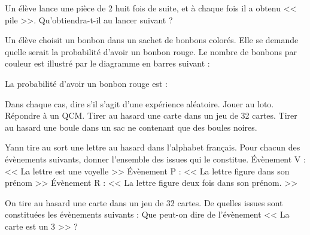 \documentclass["../Cours.tex"]{subfiles}
\begin{document}
\begin{questions}
    \exercice Un élève lance une pièce de \qty{2}{\EURO} huit fois de suite, et à chaque fois il a obtenu << pile >>. Qu'obtiendra-t-il au lancer suivant ?

    \exercice Un élève choisit un bonbon dans un sachet de bonbons colorés. Elle se demande quelle serait la probabilité d'avoir un bonbon rouge. Le nombre de bonbons par couleur est illustré par le diagramme en barres suivant :
    \begin{center}
    \end{center}

    \question La probabilité d'avoir un bonbon rouge est :

    \exercice Dans chaque cas, dire s'il s'agit d'une expérience aléatoire.
    \question Jouer au loto.
    \question Répondre à un QCM.
    \question Tirer au hasard une carte dans un jeu de 32 cartes.
    \question Tirer au hasard une boule dans un sac ne contenant que des boules noires.

    \exercice Yann tire au sort une lettre au hasard dans l'alphabet français. Pour chacun des évènements suivants, donner l'ensemble des issues qui le constitue.
    \question Évènement V : << La lettre est une voyelle >>
    \question Évènement P : << La lettre figure dans son prénom >>
    \question Évènement R : << La lettre figure deux fois dans son prénom. >>

    \exercice On tire au hasard une carte dans un jeu de 32 cartes.
    \question De quelles issues sont constituées les évènements suivants :
    \question Que peut-on dire de l'évènement << La carte est un 3 >> ?


\end{questions}
\end{document}
